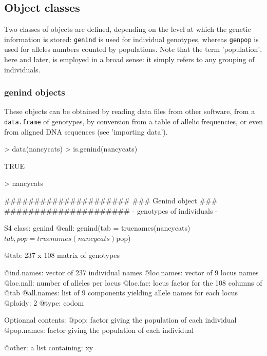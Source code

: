 \documentclass{article}
\begin{document}
\subsection{Object classes}
Two classes of objects are defined, depending on the level at which the genetic information is stored:
\texttt{genind} is used for individual genotypes, whereas \texttt{genpop} is used for alleles numbers counted by populations.
Note that the term 'population', here and later, is employed in a broad sense: it simply refers to any grouping of individuals.

\subsubsection{genind objects}
These objects can be obtained by reading data files from other software,
from a \texttt{data.frame} of genotypes, by conversion from a table of
allelic frequencies, or even from aligned DNA sequences (see 'importing data').
\begin{Schunk}
\begin{Sinput}
> data(nancycats)
> is.genind(nancycats)
\end{Sinput}
\begin{Soutput}
[1] TRUE
\end{Soutput}
\begin{Sinput}
> nancycats
\end{Sinput}
\begin{Soutput}
   #####################
   ### Genind object ### 
   #####################
- genotypes of individuals - 

S4 class:  genind
@call: genind(tab = truenames(nancycats)$tab, pop = truenames(nancycats)$pop)

@tab:  237 x 108 matrix of genotypes

@ind.names: vector of  237 individual names
@loc.names: vector of  9 locus names
@loc.nall: number of alleles per locus
@loc.fac: locus factor for the  108 columns of @tab
@all.names: list of  9 components yielding allele names for each locus
@ploidy:  2
@type:  codom

Optionnal contents: 
@pop:  factor giving the population of each individual
@pop.names:  factor giving the population of each individual

@other: a list containing: xy 
\end{Soutput}
\end{Schunk}
\end{document}
